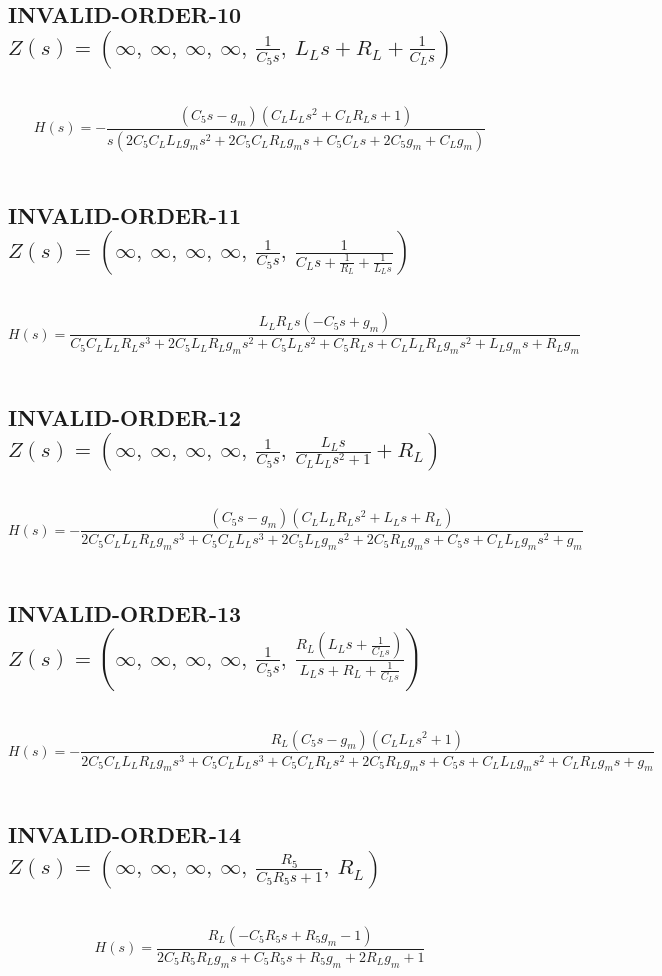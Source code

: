 \documentclass{article}
\begin{document}
\subsection{INVALID-ORDER-10 $Z(s) = \left( \infty, \  \infty, \  \infty, \  \infty, \  \frac{1}{C_{5} s}, \  L_{L} s + R_{L} + \frac{1}{C_{L} s}\right)$ } \ 
\textbf{\[H(s) = - \frac{\left(C_{5} s - g_{m}\right) \left(C_{L} L_{L} s^{2} + C_{L} R_{L} s + 1\right)}{s \left(2 C_{5} C_{L} L_{L} g_{m} s^{2} + 2 C_{5} C_{L} R_{L} g_{m} s + C_{5} C_{L} s + 2 C_{5} g_{m} + C_{L} g_{m}\right)}\] } \ 
\subsection{INVALID-ORDER-11 $Z(s) = \left( \infty, \  \infty, \  \infty, \  \infty, \  \frac{1}{C_{5} s}, \  \frac{1}{C_{L} s + \frac{1}{R_{L}} + \frac{1}{L_{L} s}}\right)$ } \ 
\textbf{\[H(s) = \frac{L_{L} R_{L} s \left(- C_{5} s + g_{m}\right)}{C_{5} C_{L} L_{L} R_{L} s^{3} + 2 C_{5} L_{L} R_{L} g_{m} s^{2} + C_{5} L_{L} s^{2} + C_{5} R_{L} s + C_{L} L_{L} R_{L} g_{m} s^{2} + L_{L} g_{m} s + R_{L} g_{m}}\] } \ 
\subsection{INVALID-ORDER-12 $Z(s) = \left( \infty, \  \infty, \  \infty, \  \infty, \  \frac{1}{C_{5} s}, \  \frac{L_{L} s}{C_{L} L_{L} s^{2} + 1} + R_{L}\right)$ } \ 
\textbf{\[H(s) = - \frac{\left(C_{5} s - g_{m}\right) \left(C_{L} L_{L} R_{L} s^{2} + L_{L} s + R_{L}\right)}{2 C_{5} C_{L} L_{L} R_{L} g_{m} s^{3} + C_{5} C_{L} L_{L} s^{3} + 2 C_{5} L_{L} g_{m} s^{2} + 2 C_{5} R_{L} g_{m} s + C_{5} s + C_{L} L_{L} g_{m} s^{2} + g_{m}}\] } \ 
\subsection{INVALID-ORDER-13 $Z(s) = \left( \infty, \  \infty, \  \infty, \  \infty, \  \frac{1}{C_{5} s}, \  \frac{R_{L} \left(L_{L} s + \frac{1}{C_{L} s}\right)}{L_{L} s + R_{L} + \frac{1}{C_{L} s}}\right)$ } \ 
\textbf{\[H(s) = - \frac{R_{L} \left(C_{5} s - g_{m}\right) \left(C_{L} L_{L} s^{2} + 1\right)}{2 C_{5} C_{L} L_{L} R_{L} g_{m} s^{3} + C_{5} C_{L} L_{L} s^{3} + C_{5} C_{L} R_{L} s^{2} + 2 C_{5} R_{L} g_{m} s + C_{5} s + C_{L} L_{L} g_{m} s^{2} + C_{L} R_{L} g_{m} s + g_{m}}\] } \ 
\subsection{INVALID-ORDER-14 $Z(s) = \left( \infty, \  \infty, \  \infty, \  \infty, \  \frac{R_{5}}{C_{5} R_{5} s + 1}, \  R_{L}\right)$ } \ 
\textbf{\[H(s) = \frac{R_{L} \left(- C_{5} R_{5} s + R_{5} g_{m} - 1\right)}{2 C_{5} R_{5} R_{L} g_{m} s + C_{5} R_{5} s + R_{5} g_{m} + 2 R_{L} g_{m} + 1}\] } \ 
\end{document}
